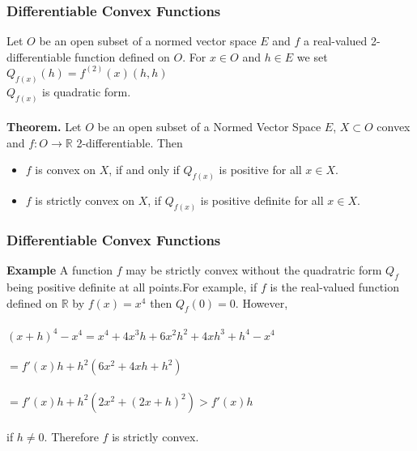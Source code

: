 \documentclass{beamer}
\newcommand{\R}{\mathbb{R}}
\begin{document}
\begin{frame}
\frametitle{Differentiable Convex Functions}
Let $O$ be an open subset of a normed vector space $E$ and $f$ a real-valued 2-differentiable function defined on $O$. For $x \in O$ and $h \in E$ we set \\

\hspace{3cm} $Q_{f(x)}(h) = f^{(2)}(x) (h,h)$ \\

$Q_{f(x)}$ is quadratic form.\\~\\

\textbf{Theorem.} Let $O$ be an open subset of a Normed Vector Space $E$, $X \subset O$ convex and $f: O \to \R$ 2-differentiable. Then
\begin{itemize}
\item $f$ is convex on $X$, if and only if $Q_{f(x)}$ is positive for all $x \in X$.
\item $f$ is strictly convex on $X$, if $Q_{f(x)}$ is positive definite for all $x \in X$.
\end{itemize}


\end{frame}

\begin{frame}
\frametitle{Differentiable Convex Functions}
\textbf{Example}
A function $f$ may be strictly convex without the quadratric form $Q_f$ being
positive definite at all points.For example, if $f$ is the real-valued function defined
on $\R$ by $f(x) = x^4$ then $Q_f(0) = 0$. However,\\~\\

\hspace{1cm} $(x+h)^4 - x^4 = x^4 + 4x^3h + 6x^2h^2 + 4xh^3 + h^4 - x^4$\\~\\
\hspace{33mm} $ = f'(x)h + h^2(6x^2 + 4xh + h^2)$\\~\\
\hspace{33mm} $ = f'(x)h + h^2(2x^2 + (2x+h)^2) > f'(x)h$ \\~\\

if $h \neq 0$. Therefore $f$ is strictly convex.

\end{frame}

\end{document}
